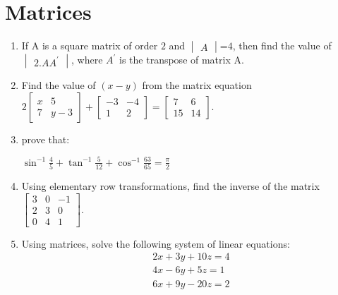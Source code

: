 \documentclass{article}
\providecommand{\brak}[1]{\ensuremath{\left(#1\right)}}
\newcommand{\mydet}[1]{\ensuremath{\begin{vmatrix}#1\end{vmatrix}}}
\newcommand{\myvec}[1]{\ensuremath{\begin{bmatrix}#1\end{bmatrix}}}
\begin{document}
\section{Matrices}
\begin{enumerate}
\item If A is a square matrix of order $2$ and \mydet{A}=$4$, then find the value of $\mydet{2.A A^{\prime}}$, where $A^{\prime}$ is the transpose of matrix A.
\item Find the value of \brak{x-y} from the matrix equation $2\myvec{x & 5\\7 & y-3}+\myvec{-3&-4\\1&2}=\myvec{7&6\\15&14}$.
\item prove that:

	$\sin^{-1}\frac{4}{5}+\tan^{-1}\frac{5}{12}+\cos^{-1}\frac{63}{65}=\frac{\pi}{2}$
\item Using elementary row transformations, find the inverse of the matrix \myvec{3&0&-1\\2&3&0\\0&4&1}.
\item Using matrices, solve the following system of linear equations:\begin{align*}2x+3y+10z=4\\4x-6y+5z=1\\6x+9y-20z=2 \end{align*}
\end{enumerate}
\end{document}
